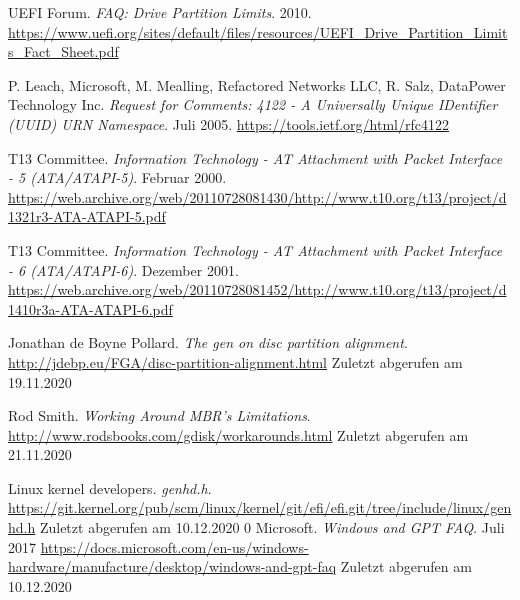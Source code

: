 \begin{thebibliography}{9}
        UEFI Forum.
        \textit{FAQ: Drive Partition Limits}.
        2010.
        \url{https://www.uefi.org/sites/default/files/resources/UEFI_Drive_Partition_Limits_Fact_Sheet.pdf}

        P. Leach, Microsoft, M. Mealling, Refactored Networks LLC, R. Salz, DataPower Technology Inc.
        \textit{Request for Comments: 4122 - A Universally Unique IDentifier (UUID) URN Namespace}.
        Juli 2005.
        \url{https://tools.ietf.org/html/rfc4122}

        T13 Committee.
        \textit{Information Technology - AT Attachment with Packet Interface - 5 (ATA/ATAPI-5)}.
        Februar 2000.
        \url{https://web.archive.org/web/20110728081430/http://www.t10.org/t13/project/d1321r3-ATA-ATAPI-5.pdf}

        T13 Committee.
        \textit{Information Technology - AT Attachment with Packet Interface - 6 (ATA/ATAPI-6)}.
        Dezember 2001.
        \url{https://web.archive.org/web/20110728081452/http://www.t10.org/t13/project/d1410r3a-ATA-ATAPI-6.pdf}

        Jonathan de Boyne Pollard.
        \textit{The gen on disc partition alignment}.
        \url{http://jdebp.eu/FGA/disc-partition-alignment.html}
        Zuletzt abgerufen am 19.11.2020

        Rod Smith.
        \textit{Working Around MBR's Limitations}.
        \url{http://www.rodsbooks.com/gdisk/workarounds.html}
        Zuletzt abgerufen am 21.11.2020

        Linux kernel developers.
        \textit{genhd.h}.
        \url{https://git.kernel.org/pub/scm/linux/kernel/git/efi/efi.git/tree/include/linux/genhd.h}
        Zuletzt abgerufen am 10.12.2020
0
        Microsoft.
        \textit{Windows and GPT FAQ}.
        Juli 2017
        \url{https://docs.microsoft.com/en-us/windows-hardware/manufacture/desktop/windows-and-gpt-faq}
        Zuletzt abgerufen am 10.12.2020

\end{thebibliography}
